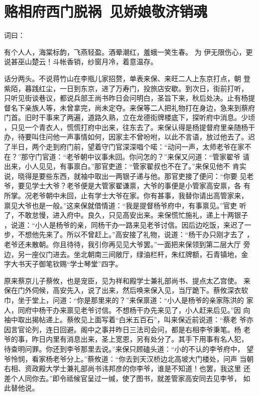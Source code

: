 \chapter{赂相府西门脱祸~见娇娘敬济销魂}

词曰：

有个人人，海棠标韵，飞燕轻盈。酒晕潮红，羞蛾一笑生春。  为
伊无限伤心，更说甚巫山楚云！斗帐香销，纱窗月冷，着意温存。

话分两头。不说蒋竹山在李瓶儿家招赘，单表来保、来旺二人上东京打点，朝
登紫陌，暮践红尘，一日到东京，进了万寿门，投旅店安歇。到次日，街前打听，
只听见街谈巷议，都说兵部王尚书昨日会问明白，圣旨下来，秋后处决。止有杨提
督名下亲族人等，未曾拿完，尚未定夺。来保等二人把礼物打在身边，急来到蔡府
门首。旧时干事来了两遍，道路久熟，立在龙德街牌楼底下，探听府中消息。少顷
，只见一个青衣人，慌慌打府中出来，往东去了。来保认得是杨提督府里亲随杨干
办，待要叫住问他一声事情如何，因家主不曾吩咐，以此不言语，放过他去了。迟
了半日，两个走到府门前，望着守门官深深唱个喏：“动问一声，太师老爷在家不
在？”那守门官道：“老爷朝中议事未回。你问怎的？”来保又问道：“管家翟爷
请出来，小人见见，有事禀白。”那官吏道：“管家翟叔也不在了。”来保见他不
肯实说，晓得是要些东西，就袖中取出一两银子递与他。那官吏接了便问：“你要
见老爷，要见学士大爷？老爷便是大管家翟谦禀，大爷的事便是小管家高安禀，各
有所掌。况老爷朝中未回，止有学士大爷在家。你有甚事，我替你请出高管家来，
禀见大爷也是一般。”这来保就借情道：“我是提督杨爷府中，有事禀见。”官吏
听了，不敢怠慢，进入府中。良久，只见高安出来。来保慌忙施礼，递上十两银子
，说道：“小人是杨爷的亲，同杨干办一路来见老爷讨信。因后边吃饭，来迟了一
步，不想他先来了。所以不曾赶上。”高安接了礼物，说道：“杨干办只刚才去了
，老爷还未散朝。你且待待，我引你再见见大爷罢。”一面把来保领到第二层大厅
旁边，另一座仪门进去。坐北朝南三间敞厅，绿油栏杆，朱红牌额，石青镇地，金
字大书天子御笔钦赐“学士琴堂”四字。

原来蔡京儿子蔡攸，也是宠臣，见为祥和殿学士兼礼部尚书、提点太乙宫使。
来保在门外伺候，高安先入，说了出来，然后唤来保入见，当厅跪下。蔡攸深衣软
巾，坐于堂上，问道：“你是那里来的？”来保禀道：“小人是杨爷的亲家陈洪的
家人，同府中杨干办来禀见老爷讨信。不想杨干办先来见了，小人赶来后见。”因
向袖中取出揭帖递上。蔡攸见上面写着“白米五百石”，叫来保近前说道：“蔡老
爷亦因言官论列，连日回避。阁中之事并昨日三法司会问，都是右相李爷秉笔。杨
老爷的事，昨日内里有消息出来，圣上宽恩，另有处分了。其手下用事有名人犯，
待查明问罪。你还到李爷那里去说。”来保只顾磕头道：“小的不认的李爷府中，
望爷怜悯，看家杨老爷分上。”蔡攸道：“你去到天汉桥边北高坡大门楼处，问声
当朝右相、资政殿大学士兼礼部尚书讳邦彦的你李爷，谁是不知道！也罢，我这里
还差个人同你去。”即令祗候官呈过一缄，使了图书，就差管家高安同去见李爷，
如此替他说。

